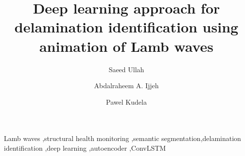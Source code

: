 \documentclass[preprint,9pt]{elsarticle}
\begin{document}
	\begin{frontmatter}
		\title{Deep learning approach for delamination identification using animation of Lamb waves}

		\address[IFFM]{Institute of Fluid Flow Machinery, Polish Academy of Sciences, Poland}
		\author{Saeed Ullah}
		\author{Abdalraheem A. Ijjeh}
		\author{Pawel Kudela}

\begin{abstract}
	
\end{abstract}

\begin{keyword}
	Lamb waves \sep structural health monitoring \sep semantic segmentation\sep delamination identification \sep deep learning \sep  autoencoder \sep ConvLSTM 
	
	
\end{keyword}
	\end{frontmatter}
	
	
	
	
	
	\clearpage
	
\end{document}
